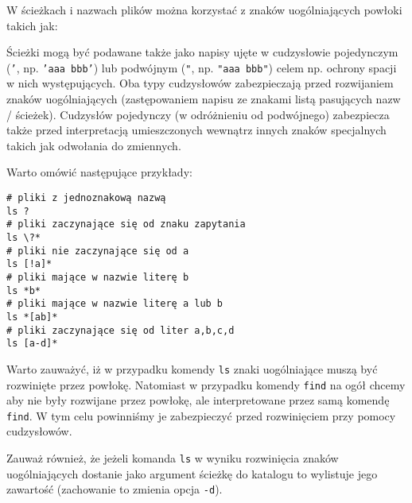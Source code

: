 \documentclass{pdfBooklets}
\begin{document}
\noindent W ścieżkach i nazwach plików można korzystać z znaków uogólniających powłoki takich jak:
Ścieżki mogą być podawane także jako napisy ujęte w cudzysłowie pojedynczym (\texttt{'}, np. \texttt{'aaa bbb'}) lub podwójnym (\texttt{"}, np. \texttt{"aaa bbb"}) celem np. ochrony spacji w nich występujących.
Oba typy cudzysłowów zabezpieczają przed rozwijaniem znaków uogólniających (zastępowaniem napisu ze znakami listą pasujących nazw / ścieżek). Cudzysłów pojedynczy (w odróżnieniu od podwójnego) zabezpiecza także przed interpretacją umieszczonych wewnątrz innych znaków specjalnych takich jak odwołania do zmiennych.

\begin{teacherOnly}
Warto omówić następujące przykłady:
\begin{Verbatim}
# pliki z jednoznakową nazwą
ls ?
# pliki zaczynające się od znaku zapytania
ls \?*
# pliki nie zaczynające się od a
ls [!a]*
# pliki mające w nazwie literę b
ls *b*
# pliki mające w nazwie literę a lub b
ls *[ab]*
# pliki zaczynające się od liter a,b,c,d
ls [a-d]*
\end{Verbatim}
\end{teacherOnly}

Warto zauważyć, iż w przypadku komendy \texttt{ls} znaki uogólniające muszą być rozwinięte przez powłokę.
Natomiast w przypadku komendy \texttt{find} na ogół chcemy aby nie były rozwijane przez powłokę, ale interpretowane przez samą komendę \texttt{find}.
W tym celu powinniśmy je zabezpieczyć przed rozwinięciem przy pomocy cudzysłowów.

Zauważ również, że jeżeli komanda \texttt{ls} w wyniku rozwinięcia znaków uogólniających dostanie jako argument ścieżkę do katalogu to wylistuje jego zawartość (zachowanie to zmienia opcja \texttt{-d}).
\end{document}
